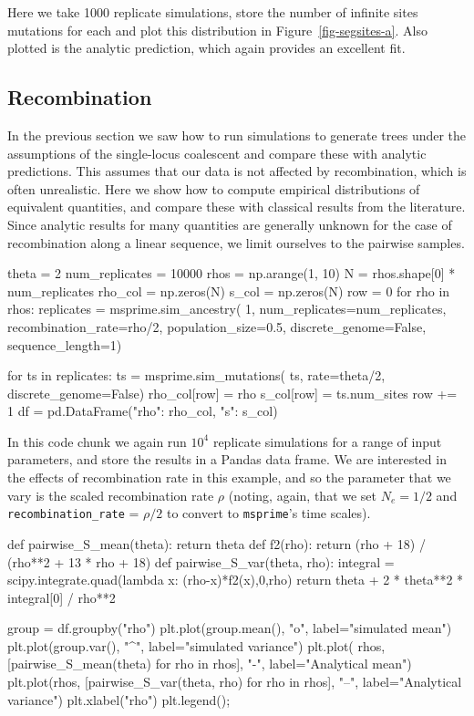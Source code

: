 \documentclass[graybox]{svmult}
\newcommand{\msprime}[0]{\texttt{msprime}}
\begin{document}
Here we take 1000 replicate simulations, store the number of infinite
sites mutations for each and plot this distribution in
Figure~\ref{fig-segsites-a}. Also plotted is the analytic prediction, which again provides an excellent fit.


\subsection{Recombination}

In the previous section we saw how to run simulations to generate trees
under the assumptions of the single-locus coalescent and compare these
with analytic predictions. This assumes that our data is not affected
by recombination, which is often unrealistic. Here we show how to
compute empirical distributions of equivalent quantities, and compare
these with classical results from the literature. Since analytic
results for many quantities are generally unknown for the case of recombination along a linear sequence, we limit ourselves to the pairwise samples.

\begin{pythoncode}
theta = 2
num_replicates = 10000
rhos = np.arange(1, 10)
N = rhos.shape[0] * num_replicates
rho_col = np.zeros(N)
s_col = np.zeros(N)
row = 0
for rho in rhos:
    replicates = msprime.sim_ancestry(
        1, num_replicates=num_replicates,
        recombination_rate=rho/2, population_size=0.5,
        discrete_genome=False, sequence_length=1)

    for ts in replicates:
        ts = msprime.sim_mutations(
            ts, rate=theta/2, discrete_genome=False)
        rho_col[row] = rho
        s_col[row] = ts.num_sites
        row += 1
df = pd.DataFrame({"rho": rho_col, "s": s_col})
\end{pythoncode}

In this code chunk we again run $10^4$ replicate simulations for a range
of input parameters, and store the results in a Pandas data frame. We
are interested in the effects of recombination rate in this example,
and so the parameter that we vary is the scaled recombination rate
$\rho$ (noting, again, that we set $N_e = 1/2$ and
\texttt{recombination\_rate} = $\rho / 2$ to convert to \msprime's
time scales).

\begin{pythoncode}
def pairwise_S_mean(theta):
    return theta
def f2(rho):
    return (rho + 18) / (rho**2 + 13 * rho + 18)
def pairwise_S_var(theta, rho):
    integral = scipy.integrate.quad(lambda x: (rho-x)*f2(x),0,rho)
    return theta + 2 * theta**2 * integral[0] / rho**2

group = df.groupby("rho")
plt.plot(group.mean(), "o", label="simulated mean")
plt.plot(group.var(), "^", label="simulated variance")
plt.plot(
    rhos, [pairwise_S_mean(theta) for rho in rhos], "-",
    label="Analytical mean")
plt.plot(rhos, [pairwise_S_var(theta, rho) for rho in rhos], "--",
label="Analytical variance")
plt.xlabel("rho")
plt.legend();
\end{pythoncode}
\end{document}
